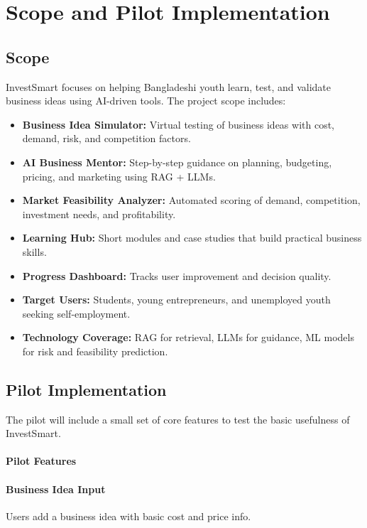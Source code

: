 \documentclass[12pt,letterpaper]{article}
\begin{document}
\section{Scope and Pilot Implementation}

\subsection{Scope}

InvestSmart focuses on helping Bangladeshi youth learn, test, and validate business ideas using AI-driven tools. The project scope includes:

\begin{itemize}
    \item \textbf{Business Idea Simulator:} Virtual testing of business ideas with cost, demand, risk, and competition factors.
    \item \textbf{AI Business Mentor:} Step-by-step guidance on planning, budgeting, pricing, and marketing using RAG + LLMs.
    \item \textbf{Market Feasibility Analyzer:} Automated scoring of demand, competition, investment needs, and profitability.
    \item \textbf{Learning Hub:} Short modules and case studies that build practical business skills.
    \item \textbf{Progress Dashboard:} Tracks user improvement and decision quality.
    \item \textbf{Target Users:} Students, young entrepreneurs, and unemployed youth seeking self-employment.
    \item \textbf{Technology Coverage:} RAG for retrieval, LLMs for guidance, ML models for risk and feasibility prediction.
\end{itemize}

\subsection{Pilot Implementation}

The pilot will include a small set of core features to test the basic usefulness of InvestSmart.

\paragraph{Pilot Features}

\paragraph{Business Idea Input}
Users add a business idea with basic cost and price info.
\end{document}
